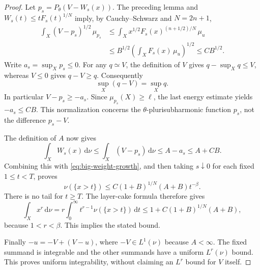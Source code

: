 \begin{proof}
Let $p_s=P_\theta(V-W_s(x))$. The preceding lemma and $W_s(t)\leq tF_s(t)^{1/N}$ imply, by Cauchy--Schwarz and $N=2n+1$,
\[
 \begin{split}
 \int_X(V-p_s)^{1/2}\,\mu_{p_s}
 &\leq\int_X x^{1/2}F_s(x)^{(n+1/2)/N}\,\mu_u\\
 &\leq B^{1/2}\left(\int_XF_s(x)\,\mu_u\right)^{1/2}
 \leq C B^{1/2}.
 \end{split}
\]
Write $a_s=\sup_Xp_s\leq0$. For any $q\simeq V$, the definition of $V$ gives $q-\sup_Xq\leq V$, whereas $V\leq0$ gives $q-V\geq q$. Consequently
\[
 \sup_X(q-V)=\sup_Xq.
\]
In particular $V-p_s\geq-a_s$. Since $\mu_{p_s}(X)\geq\ell$, the last energy estimate yields $-a_s\leq CB$. This normalization concerns the $\theta$-plurisubharmonic function $p_s$, not the difference $p_s-V$.

The definition of $A$ now gives
\[
 \int_XW_s(x)\,\mathrm{d}\nu
 \leq\int_X(V-p_s)\,\mathrm{d}\nu
 \leq A-a_s\leq A+CB.
\]
Combining this with \eqref{eq:big-weight-growth}, and then taking $s\downarrow0$ for each fixed $1\leq t<T$, proves
\[
 \nu(\{x>t\})\leq C(1+B)^{1/N}(A+B)t^{-\beta}.
\]
There is no tail for $t\geq T$. The layer-cake formula therefore gives
\[
 \int_Xx^r\,\mathrm{d}\nu
 =r\int_0^\infty t^{r-1}\nu(\{x>t\})\,\mathrm{d}t
 \leq1+C(1+B)^{1/N}(A+B),
\]
because $1<r<\beta$. This implies the stated bound.

Finally $-u=-V+(V-u)$, where $-V\in L^1(\nu)$ because $A<\infty$. The fixed summand is integrable and the other summands have a uniform $L^r(\nu)$ bound. This proves uniform integrability, without claiming an $L^r$ bound for $V$ itself.
\end{proof}
